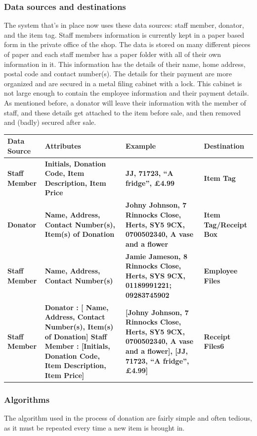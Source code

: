 \subsubsection{Data sources and destinations}
The system that’s in place now uses these data sources: staff member, donator, and the item tag.
 Staff members information is currently kept in a paper based form in the private office of the shop. The data is stored on many different pieces of paper and each staff member has a paper folder with all of their own information in it. This information has the details of their name, home address, postal code and contact number(s). The details for their payment are more organized and are secured in a metal filing cabinet with a lock. This cabinet is not large enough to contain the employee information and their payment details. As mentioned before, a donator will leave their information with the member of staff, and these details get attached to the item before sale, and then removed and (badly) secured after sale.

    \begin{tabular}{|p{3cm}|p{4cm}|p{4cm}|p{2cm}|}
        \hline
        \textbf{Data Source} & \textbf{Attributes} & \textbf{Example} & \textbf{Destination}\\ \hline 
        \textbf{Staff Member} & \textbf{Initials, Donation Code, Item Description, Item Price} & \textbf{JJ, 71723, “A fridge”, £4.99} & \textbf{Item Tag}\\ \hline 
        \textbf{Donator} & \textbf{Name, Address, Contact Number(s), Item(s) of Donation} & \textbf{Johny Johnson, 7 Rinnocks Close, Herts, SY5 9CX, 0700502340, A vase and a flower} & \textbf{Item Tag/Receipt Box}\\ \hline
        \textbf{Staff Member} & \textbf{Name, Address, Contact Number(s)} & \textbf{Jamie Jameson, 8 Rinnocks Close, Herts, SYS 9CX, 01189991221; 09283745902} & \textbf{Employee Files}\\ \hline
        \textbf{Staff Member} & \textbf{Donator : [ Name, Address, Contact Number(s), Item(s) of Donation] Staff Member : [Initials, Donation Code, Item Description, Item Price] } & \textbf{[Johny Johnson, 7 Rinnocks Close, Herts, SY5 9CX, 0700502340, A vase and a flower], [JJ, 71723, “A fridge”, £4.99]} & \textbf{Receipt Files6}\\ \hline 
    \end{tabular}

\subsubsection{Algorithms}
The algorithm used in the process  of donation are fairly simple and often tedious, as it must be repeated every time a new item is brought in.


